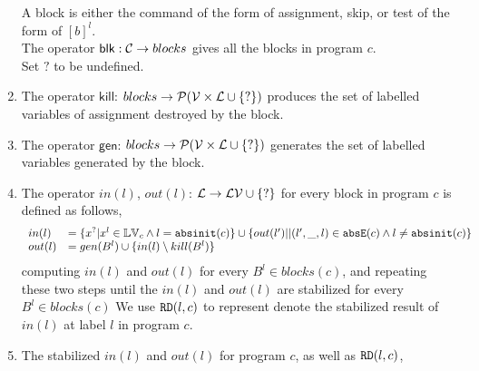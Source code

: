 \begin{enumerate}
A block  is either the command of the form of assignment, skip, or test of the form of $[b]^{l}$.\\
The operator $\mathsf{blk} : \mathcal{C} \to blocks$ gives all the blocks in program $c$.
\\
 Set $?$ to be undefined.
\item The operator $\mathsf{kill}$: $blocks \to \mathcal{P}(\mathcal{V} \times \mathcal{L} \cup \{?\})$ produces the set of labelled variables of assignment destroyed by the block.
\item  The operator $\mathsf{gen}$: $blocks \to \mathcal{P}(\mathcal{V} \times \mathcal{L} \cup \{?\})$ generates the set of labelled variables generated by the block.
\item The operator  $in(l)$, $out(l)$: $ \mathcal{L} \to \mathcal{LV} \cup \{?\}$ for every block in program $c$ is defined as follows,
 \[
 \begin{array}{ll}
    in(l)  & = \{ x^{?} | x^l \in \mathbb{LV}_c \land  l = \mathtt{abs}{\mathtt{init}}(c) \}  
    \cup \{ out(l')|  | (l',\_, l) \in \mathtt{abs}{\mathtt{E}}(c) \land  l \neq \mathtt{abs}{\mathtt{init}}(c)\}  \\
     out(l)  & =  gen(B^{l}) \cup \{ in(l) \setminus kill(B^l)  \}  
 \end{array}
 \]
computing $in(l)$ and $out(l)$ for every $B^l \in blocks(c) $, and repeating these two steps
until the $in(l)$ and $out(l)$ are stabilized for every $B^l \in blocks(c) $
We use $\mathtt{RD}(l,c)$ to represent 
denote the stabilized result of $in(l)$ at label $l$ in program $c$. 
\item The stabilized $in(l)$ and $out(l)$ for program $c$, as well as $\mathtt{RD}(l, c)$,

\end{enumerate}
